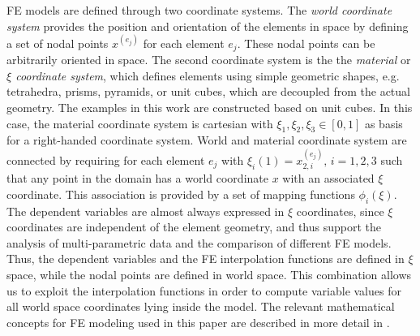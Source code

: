 \documentclass[journal]{vgtc}                %
\begin{document}
FE models are defined through two coordinate systems. The \emph{world coordinate system} provides the position and orientation of the elements in space by defining a set of nodal points $x^{(e_j)}$ for each element $e_j$. These nodal points can be arbitrarily oriented in space. The second coordinate system is the the \emph{material} or \emph{$\xi$ coordinate system}, which defines elements using simple geometric shapes, e.g. tetrahedra, prisms, pyramids, or unit cubes, which are decoupled from the actual geometry. The examples in this work are constructed based on unit cubes. In this case, the material coordinate system is cartesian with $\xi_1, \xi_2, \xi_3 \in [0,1]$ as basis for a right-handed coordinate system. World and material coordinate system are connected by requiring for each element $e_j$ with $\xi_i(1)=x^{(e_j)}_{2,i},\, i=1,2,3$ such that any point in the domain has a world coordinate $x$ with an associated $\xi$ coordinate. This association is provided by a set of mapping functions $\phi_i(\xi)$. The dependent variables are almost always expressed in $\xi$ coordinates, since $\xi$ coordinates are independent of the element geometry, and thus support the analysis of multi-parametric data and the comparison of different FE models. Thus, the dependent variables and the FE interpolation functions are defined in $\xi$ space, while the nodal points are defined in world space. This combination allows us to exploit the interpolation functions in order to compute variable values for all world space coordinates lying inside the model. The relevant mathematical concepts for FE modeling used in this paper are described in more detail in \cite{wuensche03deformation,bradley97, szabo_book, schwab_book, karniadakis_book}.
%
\end{document}
